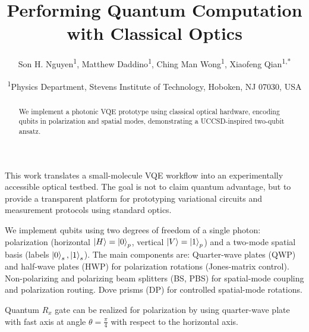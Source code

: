 \documentclass[
	a4paper,
	10pt,
	oneside,
]{article}
\title{\textbf{Performing Quantum Computation with Classical Optics}}
\author{\small Son H. Nguyen\textsuperscript{1}, Matthew Daddino\textsuperscript{1}, Ching Man Wong\textsuperscript{1}, Xiaofeng Qian\textsuperscript{1,*}}
\date{\small \textsuperscript{1}Physics Department, Stevens Institute of Technology, Hoboken, NJ 07030, USA}
\begin{document}
\maketitle
\vspace{-1.5em}


\begin{abstract}
We implement a photonic VQE prototype using classical optical hardware, encoding qubits in polarization and spatial modes, demonstrating a UCCSD-inspired two-qubit ansatz.
\end{abstract}
This work translates a small-molecule VQE workflow into an experimentally accessible optical testbed. The goal is not to claim quantum advantage, but to provide a transparent platform for prototyping variational circuits and measurement protocols using standard optics.

We implement qubits using two degrees of freedom of a single photon: polarization (horizontal $\ket{H}=\ket{0}_p$, vertical $\ket{V}=\ket{1}_p$) and a two-mode spatial basis (labels $\ket{0}_s,\ket{1}_s$). The main components are:
 Quarter-wave plates (QWP) and half-wave plates (HWP) for polarization rotations (Jones-matrix control).
 Non-polarizing and polarizing beam splitters (BS, PBS) for spatial-mode coupling and polarization routing.
 Dove prisms (DP) for controlled spatial-mode rotations. 

 Quantum \(R_x\) gate can be realized for polarization by using quarter-wave plate with fast axis at angle \(\theta = \frac{\pi}{4}\) with respect to the horizontal axis. 
\end{document}
